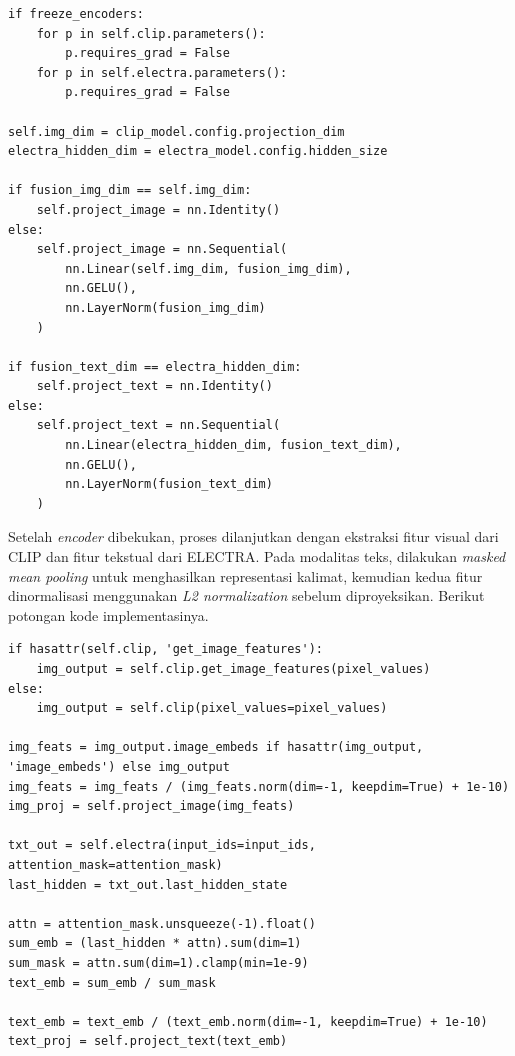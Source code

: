 \begin{lstlisting}[caption={Kode pembekuan \textit{encoder} dan \textit{projection layer} pada model multimodal}, label={code:4.multimodal_projection}]
if freeze_encoders:
    for p in self.clip.parameters():
        p.requires_grad = False
    for p in self.electra.parameters():
        p.requires_grad = False

self.img_dim = clip_model.config.projection_dim
electra_hidden_dim = electra_model.config.hidden_size

if fusion_img_dim == self.img_dim:
    self.project_image = nn.Identity()
else:
    self.project_image = nn.Sequential(
        nn.Linear(self.img_dim, fusion_img_dim),
        nn.GELU(),
        nn.LayerNorm(fusion_img_dim)
    )

if fusion_text_dim == electra_hidden_dim:
    self.project_text = nn.Identity()
else:
    self.project_text = nn.Sequential(
        nn.Linear(electra_hidden_dim, fusion_text_dim),
        nn.GELU(),
        nn.LayerNorm(fusion_text_dim)
    )
\end{lstlisting}

Setelah \textit{encoder} dibekukan, proses dilanjutkan dengan ekstraksi fitur visual dari CLIP dan fitur tekstual dari ELECTRA. Pada modalitas teks, dilakukan \textit{masked mean pooling} untuk menghasilkan representasi kalimat, kemudian kedua fitur dinormalisasi menggunakan \textit{L2 normalization} sebelum diproyeksikan. Berikut potongan kode implementasinya.

\begin{lstlisting}[caption={Kode ekstraksi fitur pada model multimodal}, label={code:4.multimodal_features}]
if hasattr(self.clip, 'get_image_features'):
    img_output = self.clip.get_image_features(pixel_values)
else:
    img_output = self.clip(pixel_values=pixel_values)

img_feats = img_output.image_embeds if hasattr(img_output, 'image_embeds') else img_output
img_feats = img_feats / (img_feats.norm(dim=-1, keepdim=True) + 1e-10)
img_proj = self.project_image(img_feats)

txt_out = self.electra(input_ids=input_ids, attention_mask=attention_mask)
last_hidden = txt_out.last_hidden_state

attn = attention_mask.unsqueeze(-1).float()
sum_emb = (last_hidden * attn).sum(dim=1)
sum_mask = attn.sum(dim=1).clamp(min=1e-9)
text_emb = sum_emb / sum_mask

text_emb = text_emb / (text_emb.norm(dim=-1, keepdim=True) + 1e-10)
text_proj = self.project_text(text_emb)
\end{lstlisting}

